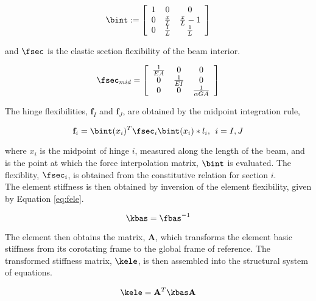 \begin{equation}
\bint := \left[
   \begin{array}{c c c}
      1 &           0 &               0 \\
      0 & \frac{x}{L} & \frac{x}{L} - 1 \\
      0 & \frac{1}{L} &     \frac{1}{L}
   \end{array} 
 \right]
\end{equation}

and $\fsec$ is the elastic section flexibility of the beam interior.

\begin{equation}
\fsec_{mid} = \left[
   \begin{array}{c c c}
      \frac{1}{EA} &            0 &                   0 \\
                 0 & \frac{1}{EI} &                   0 \\
                 0 &            0 & \frac{1}{\alpha GA}
   \end{array}
 \right]
\end{equation}

The hinge flexibilities, $\mathbf{f}_I$ and $\mathbf{f}_J$, are obtained
by the midpoint integration rule,

\begin{equation}
{\mathbf{f}}_i = \bint(x_i)^T \fsec_i \bint(x_i) * l_i, \:\: i=I,J
\end{equation}

where $x_i$ is the midpoint of hinge $i$, measured along the length of the
beam, and is the point at which the force interpolation matrix, $\bint$
is evaluated.  The flexiblity, $\fsec_i$, is obtained from the
constitutive relation for section $i$. \\

The element stiffness is then obtained by inversion of the element flexibility,
given by Equation \ref{eq:fele}.

\begin{equation}
\label{eq:kele}
\kbas = \fbas^{-1}
\end{equation}

The element then obtains the matrix, $\mathbf{A}$, which transforms the element basic
stiffness from its corotating frame to the global frame of reference.  The transformed
stiffness matrix, $\kele$, is then assembled into the structural system of equations.

\begin{equation}
\kele = \mathbf{A}^T \kbas \mathbf{A}
\end{equation} \\

